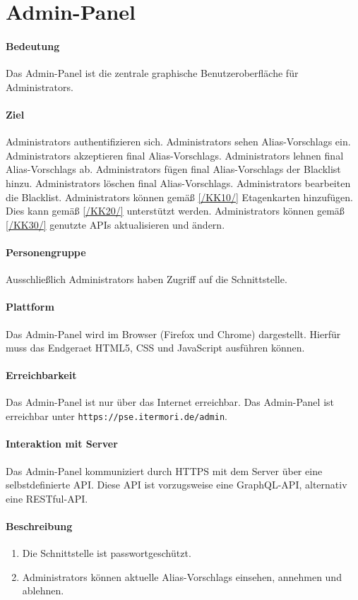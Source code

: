 \newpage
\section{Admin-Panel}
\label{Admin-Panel}

\paragraph{Bedeutung}
Das \Gls{Admin-Panel} ist die zentrale graphische Benutzeroberfläche für \Glspl{Administrator}.

\paragraph{Ziel}
\Glspl{Administrator} authentifizieren sich.
\Glspl{Administrator} sehen \Glspl{Alias-Vorschlag} ein.
\Glspl{Administrator} akzeptieren final \Glspl{Alias-Vorschlag}.
\Glspl{Administrator} lehnen final \Glspl{Alias-Vorschlag} ab.
\Glspl{Administrator} fügen final \Glspl{Alias-Vorschlag} der \Gls{Blacklist} hinzu.
\Glspl{Administrator} löschen final \Glspl{Alias-Vorschlag}.
\Glspl{Administrator} bearbeiten die \Gls{Blacklist}.
\Glspl{Administrator} können gemäß \ref{/KK10/} Etagenkarten hinzufügen. Dies kann gemäß \ref{/KK20/} unterstützt werden.
\Glspl{Administrator} können gemäß \ref{/KK30/} genutzte \Gls{API}s aktualisieren und ändern.

\paragraph{Personengruppe}
Ausschließlich \Glspl{Administrator} haben Zugriff auf die \Gls{Schnittstelle}.

\paragraph{Plattform}
Das \Gls{Admin-Panel} wird im \Gls{Browser} (\Gls{Firefox} und \Gls{Chrome}) dargestellt.
Hierfür muss das \Gls{Endgeraet} \Gls{HTML5}, \Gls{CSS} und \Gls{JavaScript} ausführen können.

\paragraph{Erreichbarkeit}
Das \Gls{Admin-Panel} ist nur über das Internet erreichbar. 
Das \Gls{Admin-Panel} ist erreichbar unter \texttt{https://pse.itermori.de/admin}.

\paragraph{Interaktion mit Server}
Das \Gls{Admin-Panel} kommuniziert durch \Gls{HTTPS} mit dem \Gls{Server} über eine selbstdefinierte \Gls{API}.
Diese \Gls{API} ist vorzugsweise eine \Gls{GraphQL}-\Gls{API}, alternativ eine \Gls{REST}ful-\Gls{API}.

\paragraph{Beschreibung}
\begin{enumerate}
    \item Die \Gls{Schnittstelle} ist passwortgeschützt.
    \item \Glspl{Administrator} können aktuelle \Glspl{Alias-Vorschlag} einsehen, annehmen und ablehnen.
\end{enumerate}